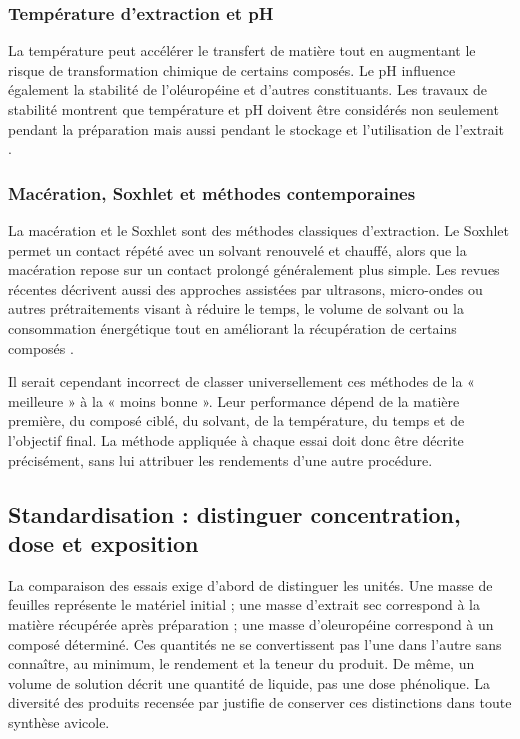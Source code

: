 \subsubsection{Température d'extraction et pH}

La température peut accélérer le transfert de matière tout en augmentant le risque de transformation chimique de certains composés. Le pH influence également la stabilité de l'oléuropéine et d'autres constituants. Les travaux de stabilité montrent que température et pH doivent être considérés non seulement pendant la préparation mais aussi pendant le stockage et l'utilisation de l'extrait \citep{Markhali2024}.

\subsubsection{Macération, Soxhlet et méthodes contemporaines}

La macération et le Soxhlet sont des méthodes classiques d'extraction. Le Soxhlet permet un contact répété avec un solvant renouvelé et chauffé, alors que la macération repose sur un contact prolongé généralement plus simple. Les revues récentes décrivent aussi des approches assistées par ultrasons, micro-ondes ou autres prétraitements visant à réduire le temps, le volume de solvant ou la consommation énergétique tout en améliorant la récupération de certains composés \citep{Debs2023}.

Il serait cependant incorrect de classer universellement ces méthodes de la « meilleure » à la « moins bonne ». Leur performance dépend de la matière première, du composé ciblé, du solvant, de la température, du temps et de l'objectif final. La méthode appliquée à chaque essai doit donc être décrite précisément, sans lui attribuer les rendements d'une autre procédure.

\subsection{Standardisation : distinguer concentration, dose et exposition}

La comparaison des essais exige d'abord de distinguer les unités. Une masse de feuilles représente le matériel initial ; une masse d'extrait sec correspond à la matière récupérée après préparation ; une masse d'oleuropéine correspond à un composé déterminé. Ces quantités ne se convertissent pas l'une dans l'autre sans connaître, au minimum, le rendement et la teneur du produit. De même, un volume de solution décrit une quantité de liquide, pas une dose phénolique. La diversité des produits recensée par \citet{Debs2023} justifie de conserver ces distinctions dans toute synthèse avicole.


